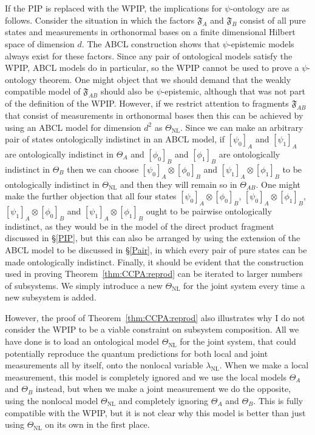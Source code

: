 \documentclass[DIV=calc,fontsize=12pt]{scrartcl} %
\theoremstyle{definition}
\theoremstyle{plain}
\newcommand{\Proj}[1]{\ensuremath{\left [ #1 \right ]}}
\begin{document}
If the PIP is replaced with the WPIP, the implications for
$\psi$-ontology are as follows.  Consider the situation in which the
factors $\mathfrak{F}_A$ and $\mathfrak{F}_B$ consist of all pure
states and measurements in orthonormal bases on a finite dimensional
Hilbert space of dimension $d$.  The ABCL construction shows that
$\psi$-epistemic models always exist for these factors.  Since any
pair of ontological models satisfy the WPIP, ABCL models do in
particular, so the WPIP cannot be used to prove a $\psi$-ontology
theorem.  One might object that we should demand that the weakly
compatible model of $\mathfrak{F}_{AB}$ should also be
$\psi$-epistemic, although that was not part of the definition of the
WPIP\@.  However, if we restrict attention to fragments
$\mathfrak{F}_{AB}$ that consist of measurements in orthonormal bases
then this can be achieved by using an ABCL model for dimension $d^2$
as $\Theta_{\text{NL}}$.  Since we can make an arbitrary pair of
states ontologically indistinct in an ABCL model, if $\Proj{\psi_0}_A$
and $\Proj{\psi_1}_A$ are ontologically indistinct in $\Theta_A$ and
$\Proj{\phi_0}_B$ and $\Proj{\phi_1}_B$ are ontologically indistinct
in $\Theta_B$ then we can choose $\Proj{\psi_0}_A \otimes
\Proj{\phi_0}_B$ and $\Proj{\psi_1}_A \otimes \Proj{\phi_1}_B$ to be
ontologically indistinct in $\Theta_{\text{NL}}$ and then they will
remain so in $\Theta_{AB}$.  One might make the further objection that
all four states $\Proj{\psi_0}_A \otimes \Proj{\phi_0}_B$,
$\Proj{\psi_0}_A \otimes \Proj{\phi_1}_B$, $\Proj{\psi_1}_A \otimes
\Proj{\phi_0}_B$ and $\Proj{\psi_1}_A \otimes \Proj{\phi_1}_B$ ought
to be pairwise ontologically indistinct, as they would be in the model
of the direct product fragment discussed in \S\ref{PIP}, but this can
also be arranged by using the extension of the ABCL model to be
discussed in \S\ref{Pair}, in which every pair of pure states can be
made ontologically indistinct.  Finally, it should be evident that the
construction used in proving Theorem~\ref{thm:CCPA:reprod} can be
iterated to larger numbers of subsystems.  We simply introduce a new
$\Theta_{\text{NL}}$ for the joint system every time a new subsystem
is added.

However, the proof of Theorem~\ref{thm:CCPA:reprod} also illustrates
why I do not consider the WPIP to be a viable constraint on subsystem
composition.  All we have done is to load an ontological model
$\Theta_{\text{NL}}$ for the joint system, that could potentially
reproduce the quantum predictions for both local and joint
measurements all by itself, onto the nonlocal variable
$\lambda_{\text{NL}}$.  When we make a local measurement, this model
is completely ignored and we use the local models $\Theta_A$ and
$\Theta_B$ instead, but when we make a joint measurement we do the
opposite, using the nonlocal model $\Theta_{\text{NL}}$ and completely
ignoring $\Theta_A$ and $\Theta_B$.  This is fully compatible with the
WPIP, but it is not clear why this model is better than just using
$\Theta_{\text{NL}}$ on its own in the first place.
\end{document}
